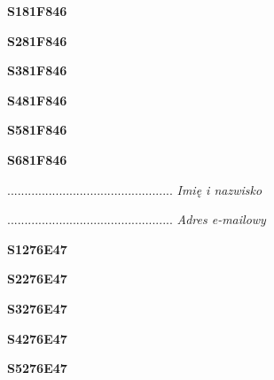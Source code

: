 \begin{turn}{90}\huge \textbf{S181F846}\end{turn}

\begin{turn}{90}\huge \textbf{S281F846}\end{turn}

\begin{turn}{90}\huge \textbf{S381F846}\end{turn}

\begin{turn}{90}\huge \textbf{S481F846}\end{turn}

\begin{turn}{90}\huge \textbf{S581F846}\end{turn}

\begin{turn}{90}\huge \textbf{S681F846}\end{turn}

\begin{turn}{90}\begin{minipage}{\linewidth} \vspace{20mm} ................................................  \textit{Imię i nazwisko}\end{minipage}\end{turn}

\begin{turn}{90}\begin{minipage}{\linewidth} \vspace{20mm} ................................................  \textit{Adres e-mailowy}\end{minipage}\end{turn}

\begin{turn}{90}\huge \textbf{S1276E47}\end{turn}

\begin{turn}{90}\huge \textbf{S2276E47}\end{turn}

\begin{turn}{90}\huge \textbf{S3276E47}\end{turn}

\begin{turn}{90}\huge \textbf{S4276E47}\end{turn}

\begin{turn}{90}\huge \textbf{S5276E47}\end{turn}

